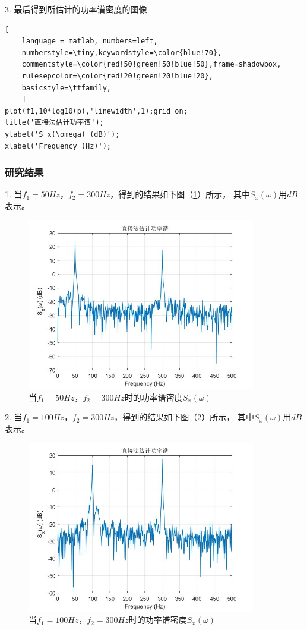 \documentclass[UTF-8, a4paper, 12pt]{ctexart}
\begin{document}
3. 最后得到所估计的功率谱密度的图像
\begin{lstlisting}[
	language = matlab, numbers=left, 
	numberstyle=\tiny,keywordstyle=\color{blue!70},
	commentstyle=\color{red!50!green!50!blue!50},frame=shadowbox,
	rulesepcolor=\color{red!20!green!20!blue!20},
	basicstyle=\ttfamily,
	]
plot(f1,10*log10(p),'linewidth',1);grid on;
title('直接法估计功率谱');
ylabel('S_x(\omega) (dB)');
xlabel('Frequency (Hz)');
\end{lstlisting}
\newpage
\subsubsection{研究结果}
1. 当$f_1=50Hz$，$ f_2=300Hz$，得到的结果如下图（\ref{p1}）所示，
其中$S_x(\omega)$用$dB$表示。
\begin{figure}[htbp]
    \centering
    \includegraphics[width=10cm]{figs/f61.jpg}
    \caption{当$f_1=50Hz$，$f_2=300Hz$时的功率谱密度$S_x(\omega)$}
    \label{p1}
\end{figure}

2. 当$f_1=100Hz$，$ f_2=300Hz$，得到的结果如下图（\ref{p2}）所示，
其中$S_x(\omega)$用$dB$表示。
\begin{figure}[htbp]
    \centering
    \includegraphics[width=10cm]{figs/f62.jpg}
    \caption{当$f_1=100Hz$，$f_2=300Hz$时的功率谱密度$S_x(\omega)$}
    \label{p2}
\end{figure}
\end{document}
